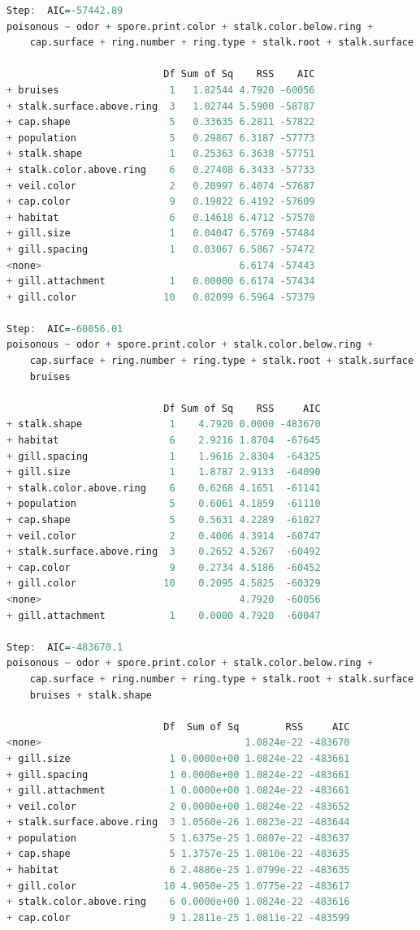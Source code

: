 \documentclass[12pt]{article}
\begin{document}
\begin{lstlisting}[language = R]
Step:  AIC=-57442.89
poisonous ~ odor + spore.print.color + stalk.color.below.ring + 
    cap.surface + ring.number + ring.type + stalk.root + stalk.surface.below.ring

                           Df Sum of Sq    RSS    AIC
+ bruises                   1   1.82544 4.7920 -60056
+ stalk.surface.above.ring  3   1.02744 5.5900 -58787
+ cap.shape                 5   0.33635 6.2811 -57822
+ population                5   0.29867 6.3187 -57773
+ stalk.shape               1   0.25363 6.3638 -57751
+ stalk.color.above.ring    6   0.27408 6.3433 -57733
+ veil.color                2   0.20997 6.4074 -57687
+ cap.color                 9   0.19822 6.4192 -57609
+ habitat                   6   0.14618 6.4712 -57570
+ gill.size                 1   0.04047 6.5769 -57484
+ gill.spacing              1   0.03067 6.5867 -57472
<none>                                  6.6174 -57443
+ gill.attachment           1   0.00000 6.6174 -57434
+ gill.color               10   0.02099 6.5964 -57379

Step:  AIC=-60056.01
poisonous ~ odor + spore.print.color + stalk.color.below.ring + 
    cap.surface + ring.number + ring.type + stalk.root + stalk.surface.below.ring + 
    bruises

                           Df Sum of Sq    RSS     AIC
+ stalk.shape               1    4.7920 0.0000 -483670
+ habitat                   6    2.9216 1.8704  -67645
+ gill.spacing              1    1.9616 2.8304  -64325
+ gill.size                 1    1.8787 2.9133  -64090
+ stalk.color.above.ring    6    0.6268 4.1651  -61141
+ population                5    0.6061 4.1859  -61110
+ cap.shape                 5    0.5631 4.2289  -61027
+ veil.color                2    0.4006 4.3914  -60747
+ stalk.surface.above.ring  3    0.2652 4.5267  -60492
+ cap.color                 9    0.2734 4.5186  -60452
+ gill.color               10    0.2095 4.5825  -60329
<none>                                  4.7920  -60056
+ gill.attachment           1    0.0000 4.7920  -60047

Step:  AIC=-483670.1
poisonous ~ odor + spore.print.color + stalk.color.below.ring + 
    cap.surface + ring.number + ring.type + stalk.root + stalk.surface.below.ring + 
    bruises + stalk.shape

                           Df  Sum of Sq        RSS     AIC
<none>                                   1.0824e-22 -483670
+ gill.size                 1 0.0000e+00 1.0824e-22 -483661
+ gill.spacing              1 0.0000e+00 1.0824e-22 -483661
+ gill.attachment           1 0.0000e+00 1.0824e-22 -483661
+ veil.color                2 0.0000e+00 1.0824e-22 -483652
+ stalk.surface.above.ring  3 1.0560e-26 1.0823e-22 -483644
+ population                5 1.6375e-25 1.0807e-22 -483637
+ cap.shape                 5 1.3757e-25 1.0810e-22 -483635
+ habitat                   6 2.4886e-25 1.0799e-22 -483635
+ gill.color               10 4.9050e-25 1.0775e-22 -483617
+ stalk.color.above.ring    6 0.0000e+00 1.0824e-22 -483616
+ cap.color                 9 1.2811e-25 1.0811e-22 -483599


\end{lstlisting}
\end{document}
